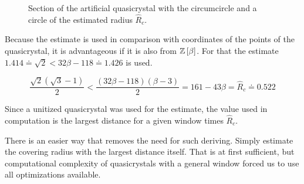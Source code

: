 \documentclass[text.tex]{subfiles}
\begin{document}
\begin{figure}[h]
\centering
{}
\caption{Section of the artificial quasicrystal with the circumcircle and a circle of the estimated radius $\hat{R}_c$.}
\label{fig:coveringRadius}
\end{figure}

Because the estimate is used in comparison with coordinates of the points of the quasicrystal, it is advantageous if it is also from $\mathbb{Z}\left[\beta\right]$. For that the estimate $1.414 \doteq \sqrt{2} <32\beta-118 \doteq 1.426$ is used.

$$\frac{\sqrt{2}(\sqrt{3}-1)}{2} < \frac{(32\beta-118)(\beta-3)}{2} = 161-43\beta = \hat{R}_c \doteq 0.522$$

Since a unitized quasicrystal was used for the estimate, the value used in computation is the largest distance for a given window times $\hat{R}_c$.

\begin{remark}
There is an easier way that removes the need for such deriving. Simply estimate the covering radius with the largest distance itself. That is at first sufficient, but computational complexity of quasicrystals with a general window forced us to use all optimizations available.
\end{remark}
\end{document}
